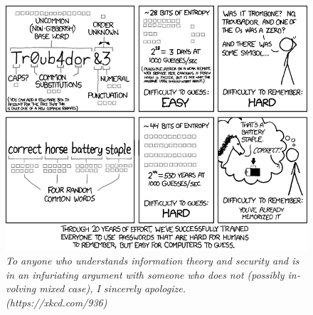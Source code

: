 \vfill

\begin{figure}[h!]
\centering
\includegraphics[width=.9\linewidth,keepaspectratio]{img/xkcd/password_strength.png}
\caption*{{\small
    \foreignlanguage{english}{
      \textit{To anyone who understands information theory and security and is in an infuriating argument with someone who does not (possibly involving mixed case), I sincerely apologize.\\\hspace*{1mm}\hfill(https://xkcd.com/936)}
    }
  }
}
\end{figure}

